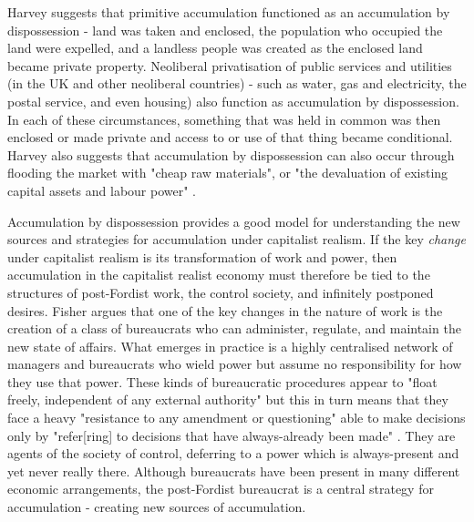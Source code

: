 Harvey suggests that primitive accumulation functioned as an accumulation by dispossession - land was taken and enclosed, the population who occupied the land were expelled, and a landless people was created as the enclosed land became private property. Neoliberal privatisation of public services and utilities (in the UK and other neoliberal countries) - such as water, gas and electricity, the postal service, and even housing) also function as accumulation by dispossession. In each of these circumstances, something that was held in common was then enclosed or made private and access to or use of that thing became conditional. Harvey also suggests that accumulation by dispossession can also occur through flooding the market with "cheap raw materials", or "the devaluation of existing capital assets and labour power" \citep[150]{harvey_new_2003}.

Accumulation by dispossession provides a good model for understanding the new sources and strategies for accumulation under capitalist realism. If the key \emph{change} under capitalist realism is its transformation of work and power, then accumulation in the capitalist realist economy must therefore be tied to the structures of post-Fordist work, the control society, and infinitely postponed desires. Fisher argues that one of the key changes in the nature of work is the creation of a class of bureaucrats who can administer, regulate, and maintain the new state of affairs. What emerges in practice is a highly centralised network of managers and bureaucrats who wield power but assume no responsibility for how they use that power. These kinds of bureaucratic procedures appear to "float freely, independent of any external authority" but this in turn means that they face a heavy "resistance to any amendment or questioning" \citep[55]{fisher_capitalist_2009} able to make decisions only by "refer[ring] to decisions that have always-already been made" \citep[53]{fisher_capitalist_2009}. They are agents of the society of control, deferring to a power which is always-present and yet never really there. Although bureaucrats have been present in many different economic arrangements, the post-Fordist bureaucrat is a central strategy for accumulation - creating new sources of accumulation.


